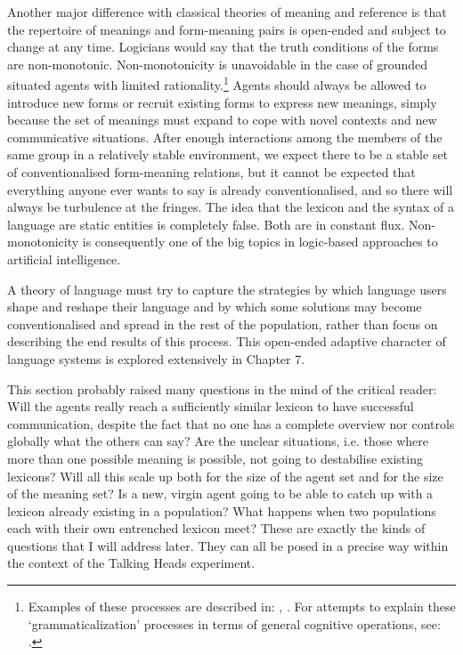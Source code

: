 Another major difference with classical theories of 
meaning and reference is 
that the repertoire of meanings and form-meaning pairs is open-ended
and subject to change at any time. Logicians would say that the 
truth conditions of the forms are non-monotonic. 
Non-monotonicity is unavoidable in the case of grounded 
situated agents with limited rationality.\footnote{
Examples of these processes are described in: 
\cite{Bybee:1994}, \cite{Traugott:1991}.
For attempts to explain these `grammaticalization' 
processes in terms of general cognitive operations, see: 
\cite{Heine:1997}.}
Agents should always be allowed to 
introduce new forms or recruit existing forms to express new
meanings, simply because the set of meanings must expand
to cope with novel contexts and new communicative
situations. After enough interactions among the 
members of the same group in a relatively stable 
environment, we expect there to be
a stable set of conventionalised form-meaning 
relations, but it cannot be
expected that everything anyone ever wants to say is
already conventionalised, and so there will always
be turbulence at the fringes. The idea that the lexicon
and the syntax of a language are static
entities is completely false. Both are in constant flux.
Non-monotonicity is consequently one of the big 
topics in logic-based approaches to artificial intelligence.

A theory of language must try 
to capture the strategies by which language users shape and 
reshape their language and by which some solutions may become 
conventionalised and spread in the rest of the population, 
rather than focus on describing the end results of 
this process. This open-ended adaptive character of 
language systems is explored extensively in Chapter 7. 

This section probably raised many questions in the 
mind of the critical reader: Will the agents really 
reach a sufficiently similar lexicon to have successful 
communication, despite the fact that no one has a 
complete overview nor controls globally what the others
can say? Are the unclear situations, i.e. those
where more than one possible meaning is possible, not 
going to destabilise existing lexicons? Will all this 
scale up both for the size of the agent set and for 
the size of the meaning set? Is a new, virgin agent 
going to be able to catch up with a lexicon already 
existing in a population? What happens when two 
populations each with their own entrenched lexicon meet? 
These are exactly the kinds of questions that I will 
address later. They can all be posed in a precise 
way within the context of the Talking Heads experiment.

